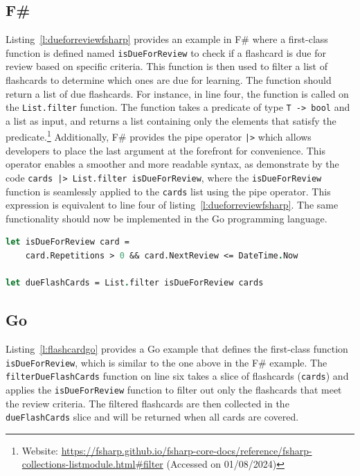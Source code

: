     \subsection*{F\#}
    Listing\ \ref{l:dueforreviewfsharp} provides an example in F\# where a first-class function is defined named \texttt{isDueForReview} to check if a flashcard is due for review based on specific criteria. This function is then used to filter a list of flashcards to determine which ones are due for learning. The function should return a list of due flashcards. For instance, in line four, the function is called on the \texttt{List.filter} function. The function takes a predicate of type \texttt{T -> bool} and a list as input, and returns a list containing only the elements that satisfy the predicate.\footnote{Website: \url{https://fsharp.github.io/fsharp-core-docs/reference/fsharp-collections-listmodule.html\#filter} (Accessed on 01/08/2024)} Additionally, F\# provides the pipe operator \texttt{|>} which allows developers to place the last argument at the forefront for convenience. This operator enables a smoother and more readable syntax, as demonstrate by the code \texttt{cards |> List.filter isDueForReview}, where the \texttt{isDueForReview} function is seamlessly applied to the \texttt{cards} list using the pipe operator. This expression is equivalent to line four of listing\ \ref{l:dueforreviewfsharp}. The same functionality should now be implemented in the Go programming language.

\begin{lstlisting}[language=fsharp, firstnumber=1,float=tp, caption={First-class function reresentation in F\#}, label=l:dueforreviewfsharp]
let isDueForReview card =
    card.Repetitions > 0 && card.NextReview <= DateTime.Now
        
let dueFlashCards = List.filter isDueForReview cards
\end{lstlisting}
        
    \subsection*{Go}
    Listing\ \ref{l:flashcardgo} provides a Go example that defines the first-class function \texttt{isDueForReview}, which is similar to the one above in the F\# example. The \texttt{filterDueFlashCards} function on line six takes a slice of flashcards (\texttt{cards}) and applies the \texttt{isDueForReview} function to filter out only the flashcards that meet the review criteria. The filtered flashcards are then collected in the \texttt{dueFlashCards} slice and will be returned when all cards are covered.
    
